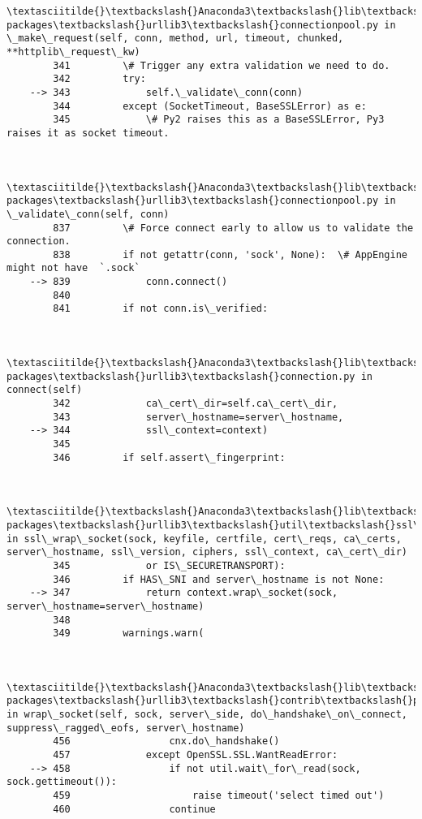 \documentclass[11pt]{article}
\begin{document}
\begin{Verbatim}[commandchars=\\\{\}]
        \textasciitilde{}\textbackslash{}Anaconda3\textbackslash{}lib\textbackslash{}site-packages\textbackslash{}urllib3\textbackslash{}connectionpool.py in \_make\_request(self, conn, method, url, timeout, chunked, **httplib\_request\_kw)
        341         \# Trigger any extra validation we need to do.
        342         try:
    --> 343             self.\_validate\_conn(conn)
        344         except (SocketTimeout, BaseSSLError) as e:
        345             \# Py2 raises this as a BaseSSLError, Py3 raises it as socket timeout.
    

        \textasciitilde{}\textbackslash{}Anaconda3\textbackslash{}lib\textbackslash{}site-packages\textbackslash{}urllib3\textbackslash{}connectionpool.py in \_validate\_conn(self, conn)
        837         \# Force connect early to allow us to validate the connection.
        838         if not getattr(conn, 'sock', None):  \# AppEngine might not have  `.sock`
    --> 839             conn.connect()
        840 
        841         if not conn.is\_verified:
    

        \textasciitilde{}\textbackslash{}Anaconda3\textbackslash{}lib\textbackslash{}site-packages\textbackslash{}urllib3\textbackslash{}connection.py in connect(self)
        342             ca\_cert\_dir=self.ca\_cert\_dir,
        343             server\_hostname=server\_hostname,
    --> 344             ssl\_context=context)
        345 
        346         if self.assert\_fingerprint:
    

        \textasciitilde{}\textbackslash{}Anaconda3\textbackslash{}lib\textbackslash{}site-packages\textbackslash{}urllib3\textbackslash{}util\textbackslash{}ssl\_.py in ssl\_wrap\_socket(sock, keyfile, certfile, cert\_reqs, ca\_certs, server\_hostname, ssl\_version, ciphers, ssl\_context, ca\_cert\_dir)
        345             or IS\_SECURETRANSPORT):
        346         if HAS\_SNI and server\_hostname is not None:
    --> 347             return context.wrap\_socket(sock, server\_hostname=server\_hostname)
        348 
        349         warnings.warn(
    

        \textasciitilde{}\textbackslash{}Anaconda3\textbackslash{}lib\textbackslash{}site-packages\textbackslash{}urllib3\textbackslash{}contrib\textbackslash{}pyopenssl.py in wrap\_socket(self, sock, server\_side, do\_handshake\_on\_connect, suppress\_ragged\_eofs, server\_hostname)
        456                 cnx.do\_handshake()
        457             except OpenSSL.SSL.WantReadError:
    --> 458                 if not util.wait\_for\_read(sock, sock.gettimeout()):
        459                     raise timeout('select timed out')
        460                 continue
    


\end{Verbatim}
\end{document}
